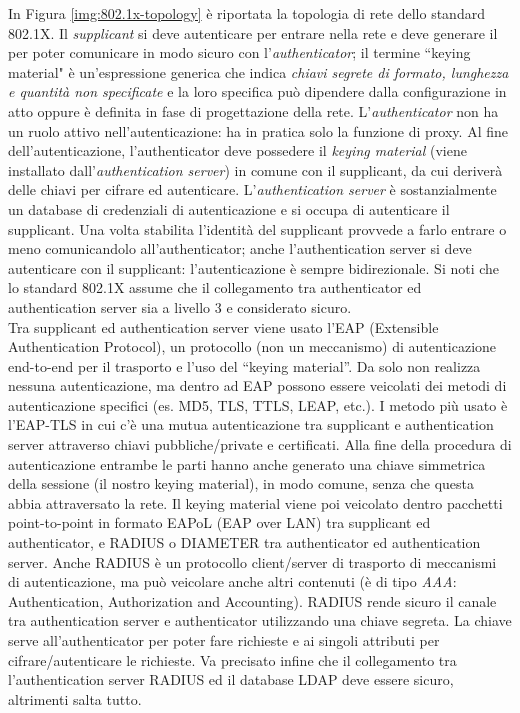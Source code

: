 In Figura \ref{img:802.1x-topology} è riportata la topologia di rete dello standard 802.1X. Il \textit{supplicant} si deve autenticare per entrare nella rete e deve generare il  per poter comunicare in modo sicuro con l'\textit{authenticator}; il termine \textquotedblleft keying material" è un'espressione generica che indica \textit{chiavi segrete di formato, lunghezza e quantità non specificate} e la loro specifica può dipendere dalla configurazione in atto oppure è definita in fase di progettazione della rete. L'\textit{authenticator} non ha un ruolo attivo nell'autenticazione: ha in pratica solo la funzione di proxy. Al fine dell'autenticazione, l'authenticator deve possedere il \textit{keying material} (viene installato dall'\textit{authentication server}) in comune con il supplicant, da cui deriverà delle chiavi per cifrare ed autenticare. L'\textit{authentication server} è sostanzialmente un database di credenziali di autenticazione e si occupa di autenticare il supplicant. Una volta stabilita l'identità del supplicant provvede a farlo entrare o meno comunicandolo all'authenticator; anche l'authentication server si deve autenticare con il supplicant: l'autenticazione è sempre bidirezionale. Si noti che lo standard 802.1X assume che il collegamento tra authenticator ed authentication server sia a livello 3 e considerato sicuro.\\
Tra supplicant ed authentication server viene usato l'EAP  (Extensible Authentication Protocol), un protocollo (non un meccanismo) di autenticazione end-to-end per il trasporto e l'uso del  “keying material”. Da solo non realizza nessuna autenticazione, ma dentro ad EAP possono essere veicolati dei metodi di autenticazione specifici (es. MD5, TLS, TTLS, LEAP, etc.). I metodo più usato è l'EAP-TLS in cui c'è una mutua autenticazione tra supplicant e authentication server attraverso chiavi pubbliche/private e certificati. Alla fine della procedura di autenticazione entrambe le parti hanno anche generato una chiave simmetrica della sessione (il nostro keying material), in modo comune, senza che questa abbia attraversato la rete. Il keying material viene poi veicolato dentro pacchetti point-to-point in formato EAPoL (EAP over LAN) tra supplicant ed authenticator, e RADIUS o DIAMETER tra authenticator ed authentication server. Anche RADIUS è un protocollo client/server di trasporto di meccanismi di autenticazione, ma può veicolare anche altri contenuti (è di tipo \textit{AAA}: Authentication, Authorization and Accounting). RADIUS rende sicuro il canale tra authentication server e authenticator utilizzando una chiave segreta. La chiave serve all'authenticator per poter fare richieste e ai singoli attributi per cifrare/autenticare le richieste. Va precisato infine che il collegamento tra l'authentication server RADIUS ed il database LDAP deve essere sicuro, altrimenti salta tutto. \\

